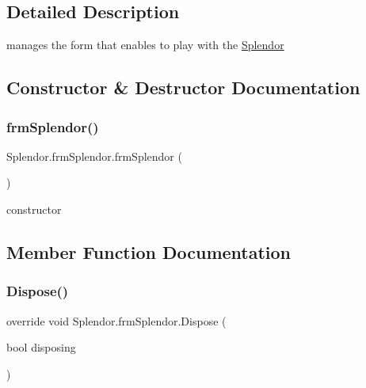 \subsection{Detailed Description}
manages the form that enables to play with the \hyperlink{namespace_splendor}{Splendor} 



\subsection{Constructor \& Destructor Documentation}
\mbox{\label{class_splendor_1_1frm_splendor_ad9c938893d23192acb1996053e3ea87b}} 
\subsubsection{\texorpdfstring{frm\+Splendor()}{frmSplendor()}}
{\footnotesize\ttfamily Splendor.\+frm\+Splendor.\+frm\+Splendor (\begin{DoxyParamCaption}{ }\end{DoxyParamCaption})}



constructor 



\subsection{Member Function Documentation}
\mbox{\label{class_splendor_1_1frm_splendor_a749f4f1d67c78e74aa1a55aa6fdd754b}} 
\subsubsection{\texorpdfstring{Dispose()}{Dispose()}}
{\footnotesize\ttfamily override void Splendor.\+frm\+Splendor.\+Dispose (\begin{DoxyParamCaption}\item[{bool}]{disposing }\end{DoxyParamCaption})\hspace{0.3cm}{\ttfamily [protected]}}



